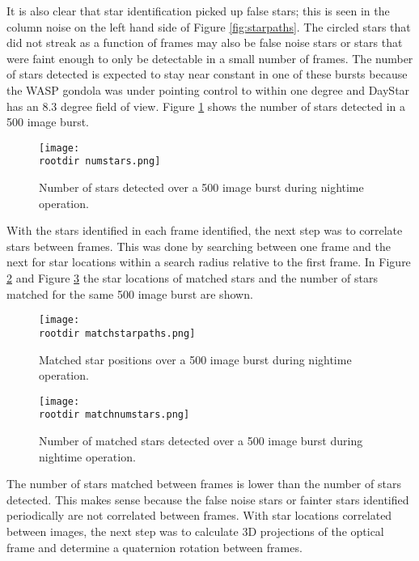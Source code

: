 \documentclass[twocolumn,letterpaper]{IEEEAerospace2012}
\newcommand{\rootdir}{./Figures/}
\begin{document}
It is also clear that star identification picked up false stars; this is seen in the column noise on the left hand side of Figure \ref{fig:starpaths}. The circled stars that did not streak as a function of frames may also be false noise stars or stars that were faint enough to only be detectable in a small number of frames. The number of stars detected is expected to stay near constant in one of these bursts because the WASP gondola was under pointing control to within one degree and DayStar has an 8.3 degree field of view. Figure \ref{fig:numstars} shows the number of stars detected in a 500 image burst.
\begin{figure}
    \centering
    \texttt{[image: \\rootdir numstars.png]}
    \caption{Number of stars detected over a 500 image burst during nightime operation.}
    \label{fig:numstars}
\end{figure}

With the stars identified in each frame identified, the next step was to correlate stars between frames. This was done by searching between one frame and the next for star locations within a search radius relative to the first frame. In Figure \ref{fig:matchstarpaths} and Figure \ref{fig:matchnumstars} the star locations of matched stars and the number of stars matched for the same 500 image burst are shown.  
\begin{figure}
    \centering
    \texttt{[image: \\rootdir matchstarpaths.png]}
    \caption{Matched star positions over a 500 image burst during nightime operation.}
    \label{fig:matchstarpaths}
\end{figure}
\begin{figure}
    \centering
    \texttt{[image: \\rootdir matchnumstars.png]}
    \caption{Number of matched stars detected over a 500 image burst during nightime operation.}
    \label{fig:matchnumstars}
\end{figure}

The number of stars matched between frames is lower than the number of stars detected. This makes sense because the false noise stars or fainter stars identified periodically are not correlated between frames. With star locations correlated between images, the next step was to calculate 3D projections of the optical frame and determine a quaternion rotation between frames.   
\end{document}
